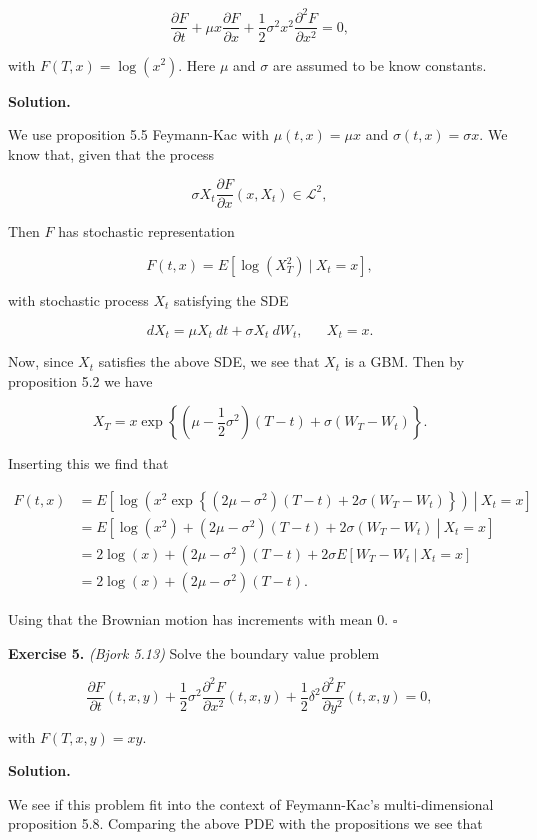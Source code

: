 \documentclass[
]{article}
\begin{document}
\[
\frac{\partial F}{\partial t}+\mu x\frac{\partial F}{\partial x}+\frac{1}{2}\sigma^2x^2\frac{\partial^2F}{\partial x^2}=0,
\]

with \(F(T,x)=\log(x^2)\). Here \(\mu\) and \(\sigma\) are assumed to be
know constants.

\textbf{Solution.}

We use proposition 5.5 Feymann-Kac with \(\mu(t,x)=\mu x\) and
\(\sigma(t,x)=\sigma x\). We know that, given that the process

\[
\sigma X_t \frac{\partial F}{\partial x}(x,X_t)\in \mathcal{L}^2,
\]

Then \(F\) has stochastic representation

\[
F(t,x)=E[\log(X_T^2)\ \vert\ X_t=x],
\]

with stochastic process \(X_t\) satisfying the SDE

\[
dX_t=\mu X_t\ dt+\sigma X_t\ dW_t,\hspace{20pt} X_t=x.
\]

Now, since \(X_t\) satisfies the above SDE, we see that \(X_t\) is a
GBM. Then by proposition 5.2 we have

\[
X_T=x\exp\left\{\left(\mu - \frac{1}{2}\sigma^2\right)(T-t)+\sigma(W_T-W_t)\right\}.
\]

Inserting this we find that

\begin{align*}
F(t,x)&=E\left.\left[\log(x^2\exp\left\{\left(2\mu - \sigma^2\right)(T-t)+2\sigma(W_T-W_t)\right\})\ \right\vert\ X_t=x\right]\\
&=E\left.\left[\log(x^2)+\left(2\mu - \sigma^2\right)(T-t)+2\sigma(W_T-W_t)\ \right\vert\ X_t=x\right]\\
&=2\log(x)+\left(2\mu - \sigma^2\right)(T-t)+2\sigma E\left.\left[W_T-W_t\ \right\vert\ X_t=x\right]\\
&=2\log(x)+\left(2\mu - \sigma^2\right)(T-t).
\end{align*}

Using that the Brownian motion has increments with mean 0. \(\square\)

\textbf{Exercise 5.} \emph{(Bjork 5.13)} Solve the boundary value
problem

\[
\frac{\partial F}{\partial t}(t,x,y)+\frac{1}{2}\sigma^2 \frac{\partial^2F}{\partial x^2}(t,x,y)+\frac{1}{2}\delta^2\frac{\partial^2F}{\partial y^2}(t,x,y)=0,
\]

with \(F(T,x,y)=xy\).

\textbf{Solution.}

We see if this problem fit into the context of Feymann-Kac's
multi-dimensional proposition 5.8. Comparing the above PDE with the
propositions we see that
\end{document}

